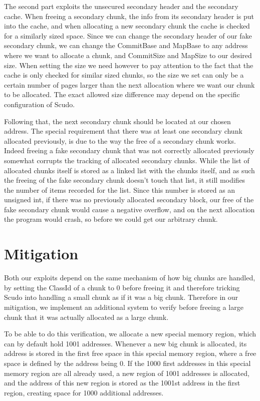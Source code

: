 \documentclass[a4paper,11pt,oneside]{report}
\begin{document}
The second part exploits the unsecured secondary header and the secondary cache. When
freeing a secondary chunk, the info from its secondary header is put into the cache, and
when allocating a new secondary chunk the cache is checked for a similarly sized
space. Since we can change the secondary header of our fake secondary chunk, we can change
the CommitBase and MapBase to any address where we want to allocate a chunk, and
CommitSize and MapSize to our desired size. When setting the size we need however to pay
attention to the fact that the cache is only checked for similar sized chunks, so the size
we set can only be a certain number of pages larger than the next allocation where we want
our chunk to be allocated. The exact allowed size difference may depend on the specific
configuration of Scudo.

Following that, the next secondary chunk should be located at our chosen address. The
special requirement that there was at least one secondary chunk allocated previously, is
due to the way the free of a secondary chunk works. Indeed freeing a fake secondary chunk
that was not correctly allocated previously somewhat corrupts the tracking of allocated
secondary chunks. While the list of allocated chunks itself is stored as a linked list
with the chunks itself, and as such the freeing of the fake secondary chunk doesn't touch
that list, it still modifies the number of items recorded for the list. Since this number
is stored as an unsigned int, if there was no previously allocated secondary block, our
free of the fake secondary chunk would cause a negative overflow, and on the next
allocation the program would crash, so before we could get our arbitrary chunk.


\chapter{Mitigation}

Both our exploits depend on the same mechanism of how big chunks are handled, by setting
the ClassId of a chunk to 0 before freeing it and therefore tricking Scudo into handling a
small chunk as if it was a big chunk. Therefore in our mitigation, we implement an
additional system to verify before freeing a large chunk that it was actually allocated as
a large chunk.

To be able to do this verification, we allocate a new special memory region, which can by
default hold 1001 addresses. Whenever a new big chunk is allocated, its address is stored
in the first free space in this special memory region, where a free space is defined by
the address being 0. If the 1000 first addresses in this special memory region are all
already used, a new region of 1001 addresses is allocated, and the address of this new
region is stored as the 1001st address in the first region, creating space for 1000
additional addresses.
\end{document}
